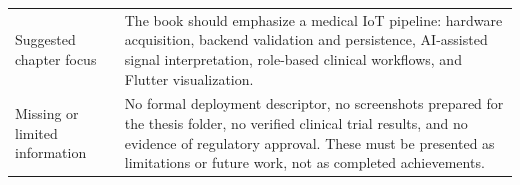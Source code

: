 \begin{longtable}{p{} p{}}
Suggested chapter focus & The book should emphasize a medical IoT pipeline: hardware acquisition, backend validation and persistence, AI-assisted signal interpretation, role-based clinical workflows, and Flutter visualization.\\
Missing or limited information & No formal deployment descriptor, no screenshots prepared for the thesis folder, no verified clinical trial results, and no evidence of regulatory approval. These must be presented as limitations or future work, not as completed achievements.\\
\bottomrule
\end{longtable}
